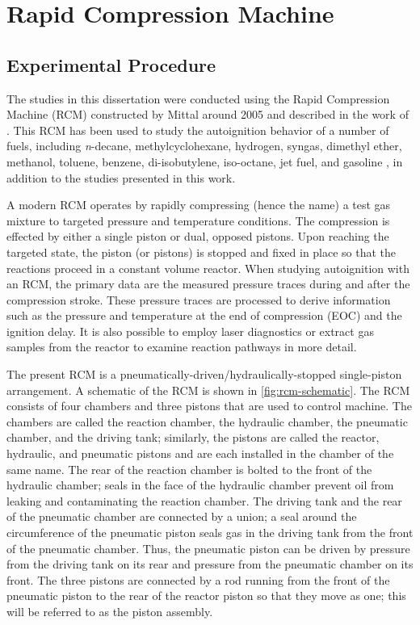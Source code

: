\documentclass[12pt, letterpaper]{article}
\begin{document}
\section{Rapid Compression Machine}
\label{sec:rcm}
\subsection{Experimental Procedure}
The studies in this dissertation were conducted using the Rapid
Compression Machine (RCM) constructed by Mittal around 2005 and described in the
work of \textcite{Mittal2007,Mittal2006a}. This RCM has been used to
study the autoignition behavior of a number of fuels, including
\textit{n}-decane, methylcyclohexane, hydrogen, syngas,
dimethyl ether, methanol, toluene, benzene, di-isobutylene, iso-octane,
jet fuel, and gasoline \cite{Kumar2009, Mittal2009, Das2012a, Mittal2006,
Das2012, Mittal2008a, Kumar2011a, Mittal2007a, Mittal2008, Kumar2010,
Dooley2010, Dooley2012, Hui2012a, Keromnes2013, Kukkadapu2013, Kukkadapu2012a},
in addition to the studies presented in this work.

A modern RCM operates by rapidly compressing (hence the name) a test gas
mixture to targeted pressure and temperature conditions. The compression
is effected by either a single piston or dual, opposed pistons. Upon
reaching the targeted state, the piston (or pistons) is stopped and
fixed in place so that the reactions proceed in a constant volume
reactor. When studying autoignition with an RCM, the primary data are
the measured pressure traces during and after the compression stroke.
These pressure traces are processed to derive information such as the
pressure and temperature at the end of compression (EOC) and the
ignition delay. It is also possible to employ laser diagnostics or
extract gas samples from the reactor to examine reaction pathways in
more detail.

The present RCM is a pneumatically-driven/hydraulically-stopped
single-piston arrangement. A schematic of the RCM is shown in
\autoref{fig:rcm-schematic}. The RCM consists of four chambers and
three pistons that are used to control machine. The chambers are
called the reaction chamber, the hydraulic chamber, the pneumatic
chamber, and the driving tank; similarly, the pistons are called
the reactor, hydraulic, and pneumatic pistons and are each installed
in the chamber of the same name. The rear of the reaction chamber
is bolted to the front of the hydraulic chamber; seals in the face
of the hydraulic chamber prevent oil from leaking and contaminating
the reaction chamber. The driving tank and the rear of the pneumatic
chamber are connected by a union; a seal around the circumference of
the pneumatic piston seals gas in the driving tank from the front of
the pneumatic chamber. Thus, the pneumatic piston can be driven by
pressure from the driving tank on its rear and pressure from the
pneumatic chamber on its front. The three pistons are connected by
a rod running from the front of the pneumatic piston to the rear of
the reactor piston so that they move as one; this will be referred
to as the piston assembly.
\end{document}
